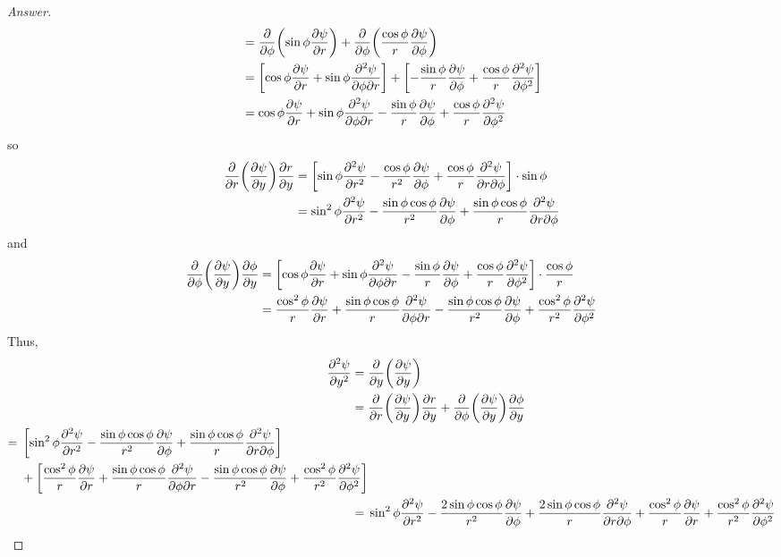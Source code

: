 \documentclass[../psets.tex]{subfiles}
\begin{document}
\begin{enumerate}
\begin{enumerate}
\begin{proof}[Answer]
\begin{align*}
                &= \pdv{\phi}(\sin\phi\pdv{\psi}{r})+\pdv{\phi}(\frac{\cos\phi}{r}\pdv{\psi}{\phi})\\
                &= \left[ \cos\phi\pdv{\psi}{r}+\sin\phi\pdv{\psi}{\phi}{r} \right]+\left[ -\frac{\sin\phi}{r}\pdv{\psi}{\phi}+\frac{\cos\phi}{r}\pdv[2]{\psi}{\phi} \right]\\
                &= \cos\phi\pdv{\psi}{r}+\sin\phi\pdv{\psi}{\phi}{r}-\frac{\sin\phi}{r}\pdv{\psi}{\phi}+\frac{\cos\phi}{r}\pdv[2]{\psi}{\phi}
            \end{align*}
            so
            \begin{align*}
                \pdv{r}(\pdv{\psi}{y})\pdv{r}{y} &= \left[ \sin\phi\pdv[2]{\psi}{r}-\frac{\cos\phi}{r^2}\pdv{\psi}{\phi}+\frac{\cos\phi}{r}\pdv{\psi}{r}{\phi} \right]\cdot\sin\phi\\
                &= \sin^2\phi\pdv[2]{\psi}{r}-\frac{\sin\phi\cos\phi}{r^2}\pdv{\psi}{\phi}+\frac{\sin\phi\cos\phi}{r}\pdv[2]{\psi}{r}{\phi}
            \end{align*}
            and
            \begin{align*}
                \pdv{\phi}(\pdv{\psi}{y})\pdv{\phi}{y} &= \left[ \cos\phi\pdv{\psi}{r}+\sin\phi\pdv{\psi}{\phi}{r}-\frac{\sin\phi}{r}\pdv{\psi}{\phi}+\frac{\cos\phi}{r}\pdv[2]{\psi}{\phi} \right]\cdot\frac{\cos\phi}{r}\\
                &= \frac{\cos^2\phi}{r}\pdv{\psi}{r}+\frac{\sin\phi\cos\phi}{r}\pdv{\psi}{\phi}{r}-\frac{\sin\phi\cos\phi}{r^2}\pdv{\psi}{\phi}+\frac{\cos^2\phi}{r^2}\pdv[2]{\psi}{\phi}
            \end{align*}
            Thus,
            \begin{align*}
                \pdv[2]{\psi}{y} ={}& \pdv{y}(\pdv{\psi}{y})\\
                ={}& \pdv{r}(\pdv{\psi}{y})\pdv{r}{y}+\pdv{\phi}(\pdv{\psi}{y})\pdv{\phi}{y}\\
                \begin{split}
                    ={}& \left[ \sin^2\phi\pdv[2]{\psi}{r}-\frac{\sin\phi\cos\phi}{r^2}\pdv{\psi}{\phi}+\frac{\sin\phi\cos\phi}{r}\pdv[2]{\psi}{r}{\phi} \right]\\
                    & +\left[ \frac{\cos^2\phi}{r}\pdv{\psi}{r}+\frac{\sin\phi\cos\phi}{r}\pdv{\psi}{\phi}{r}-\frac{\sin\phi\cos\phi}{r^2}\pdv{\psi}{\phi}+\frac{\cos^2\phi}{r^2}\pdv[2]{\psi}{\phi} \right]
                \end{split}\\
                ={}& \sin^2\phi\pdv[2]{\psi}{r}-\frac{2\sin\phi\cos\phi}{r^2}\pdv{\psi}{\phi}+\frac{2\sin\phi\cos\phi}{r}\pdv[2]{\psi}{r}{\phi}+\frac{\cos^2\phi}{r}\pdv{\psi}{r}+\frac{\cos^2\phi}{r^2}\pdv[2]{\psi}{\phi}

\end{align*}
\end{proof}
\end{enumerate}
\end{enumerate}
\end{document}
